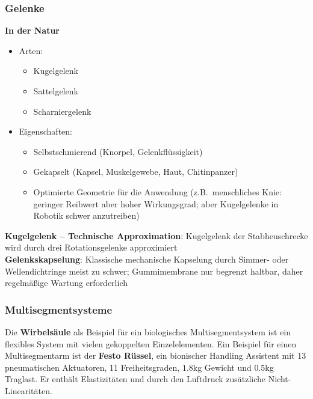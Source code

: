 \subsubsection{Gelenke}
\textbf{In der Natur}
\begin{itemize}
	\item Arten:
	\begin{itemize}
		\item Kugelgelenk
		\item Sattelgelenk
		\item Scharniergelenk
	\end{itemize}
	\item Eigenschaften:
	\begin{itemize}
		\item Selbstschmierend (Knorpel, Gelenkflüssigkeit)
		\item Gekapselt (Kapsel, Muskelgewebe, Haut, Chitinpanzer)
		\item Optimierte Geometrie für die Anwendung (z.B.\ menschliches Knie: geringer Reibwert aber hoher Wirkungsgrad; aber Kugelgelenke in Robotik schwer anzutreiben)
	\end{itemize}
\end{itemize}
\textbf{Kugelgelenk -- Technische Approximation}:
Kugelgelenk der Stabheuschrecke wird durch drei Rotationsgelenke approximiert \\
\textbf{Gelenkskapselung}: Klassische mechanische Kapselung durch Simmer- oder Wellendichtringe meist zu schwer; Gummimembrane nur begrenzt haltbar, daher regelmäßige Wartung erforderlich

\subsubsection{Multisegmentsysteme}
Die \textbf{Wirbelsäule} als Beispiel für ein biologisches Multisegmentsystem ist ein flexibles System mit vielen gekoppelten Einzelelementen.
Ein Beispiel für einen Multisegmentarm ist der \textbf{Festo Rüssel}, ein bionischer Handling Assistent mit 13 pneumatischen Aktuatoren, 11 Freiheitsgraden, $1.8$kg Gewicht und $0.5$kg Traglast.
Er enthält Elastizitäten und durch den Luftdruck zusätzliche Nicht-Linearitäten.

